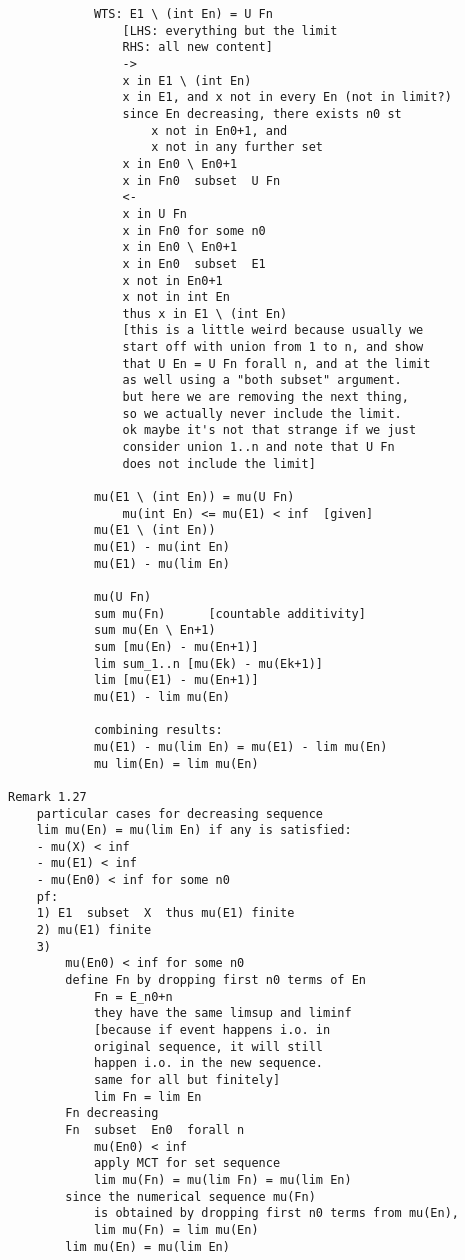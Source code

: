 \documentclass{article}
\begin{document}
\begin{flushleft}
\begin{verbatim}
            WTS: E1 \ (int En) = U Fn 
                [LHS: everything but the limit 
                RHS: all new content]
                ->
                x in E1 \ (int En)
                x in E1, and x not in every En (not in limit?)
                since En decreasing, there exists n0 st 
                    x not in En0+1, and 
                    x not in any further set
                x in En0 \ En0+1
                x in Fn0  subset  U Fn
                <-
                x in U Fn 
                x in Fn0 for some n0 
                x in En0 \ En0+1 
                x in En0  subset  E1 
                x not in En0+1 
                x not in int En 
                thus x in E1 \ (int En)
                [this is a little weird because usually we 
                start off with union from 1 to n, and show 
                that U En = U Fn forall n, and at the limit 
                as well using a "both subset" argument. 
                but here we are removing the next thing,
                so we actually never include the limit.
                ok maybe it's not that strange if we just
                consider union 1..n and note that U Fn 
                does not include the limit]

            mu(E1 \ (int En)) = mu(U Fn)
                mu(int En) <= mu(E1) < inf  [given]
            mu(E1 \ (int En))
            mu(E1) - mu(int En)
            mu(E1) - mu(lim En)

            mu(U Fn)
            sum mu(Fn)      [countable additivity]
            sum mu(En \ En+1)
            sum [mu(En) - mu(En+1)]
            lim sum_1..n [mu(Ek) - mu(Ek+1)]
            lim [mu(E1) - mu(En+1)]
            mu(E1) - lim mu(En)

            combining results:
            mu(E1) - mu(lim En) = mu(E1) - lim mu(En)
            mu lim(En) = lim mu(En)

Remark 1.27
    particular cases for decreasing sequence 
    lim mu(En) = mu(lim En) if any is satisfied:
    - mu(X) < inf 
    - mu(E1) < inf 
    - mu(En0) < inf for some n0
    pf:
    1) E1  subset  X  thus mu(E1) finite 
    2) mu(E1) finite 
    3)
        mu(En0) < inf for some n0 
        define Fn by dropping first n0 terms of En 
            Fn = E_n0+n
            they have the same limsup and liminf 
            [because if event happens i.o. in 
            original sequence, it will still 
            happen i.o. in the new sequence. 
            same for all but finitely]
            lim Fn = lim En 
        Fn decreasing 
        Fn  subset  En0  forall n
            mu(En0) < inf 
            apply MCT for set sequence 
            lim mu(Fn) = mu(lim Fn) = mu(lim En)
        since the numerical sequence mu(Fn)
            is obtained by dropping first n0 terms from mu(En),
            lim mu(Fn) = lim mu(En)
        lim mu(En) = mu(lim En)


\end{verbatim}
\end{flushleft}
\end{document}
